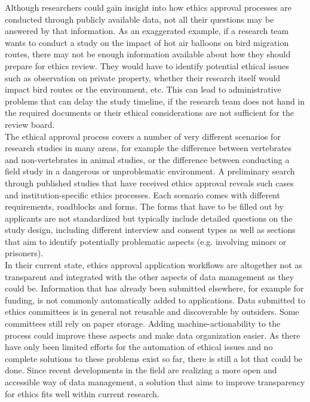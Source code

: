 \documentclass[10pt]{article}
\begin{document}
Although researchers could gain insight into how ethics approval processes are conducted  through publicly available data, not all their questions may be answered by that information. As an exaggerated example, if a research team wants to conduct a study on the impact of hot air balloons on bird migration routes, there may not be enough information available about how they should prepare for ethics review. They would have to identify potential ethical issues such as observation on private property, whether their research itself would impact bird routes or the environment, etc. This can lead to administrative problems that can delay the study timeline, if the research team does not hand in the required documents or their ethical considerations are not sufficient for the review board.\\

The ethical approval process covers a number of very different scenarios for research studies in many areas, for example the difference between vertebrates and non-vertebrates in animal studies, or the difference between conducting a field study in a dangerous or unproblematic environment. A preliminary search through published studies that have received ethics approval reveals such cases and institution-specific ethics processes. Each scenario comes with different requirements, roadblocks and forms. The forms that have to be filled out by applicants are not standardized but typically include detailed questions on the study design, including different interview and consent types as well as sections that aim to identify potentially problematic aspects (e.g. involving minors or prisoners). 
\\

In their current state, ethics approval application workflows are altogether not as transparent and integrated with the other aspects of data management as they could be. Information that has already been submitted elsewhere, for example for funding, is not commonly automatically added to applications. Data submitted to ethics committees is in general not reusable and discoverable by outsiders. Some committees still rely on paper storage. Adding machine-actionability to the process could improve these aspects and make data organization easier. As there have only been limited efforts for the automation of ethical issues and no complete solutions to these problems exist so far, there is still a lot that could be done. Since recent developments in the field are realizing a more open and accessible way of data management, a solution that aims to improve transparency for ethics fits well within current research.
\end{document}
